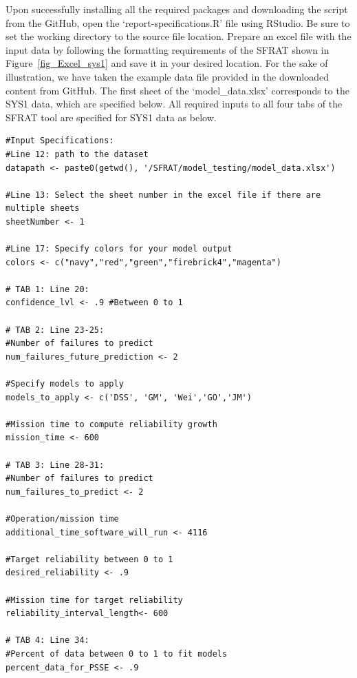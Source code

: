 \documentclass[conference]{IEEEtran}
\begin{document}
Upon successfully installing all the required packages and downloading the script from the GitHub, open the `report-specifications.R' file using RStudio. Be sure to set the working directory to the source file location. Prepare an excel file with the input data by following the formatting requirements of the SFRAT shown in Figure~\ref{fig_Excel_sys1} and save it in your desired location. For the sake of illustration, we have taken the example data file provided in the downloaded content from GitHub. The first sheet of the `model\_data.xlsx' corresponds to the SYS1 data, which are specified below. All required inputs to all four tabs of the SFRAT tool are specified for SYS1 data as below.
\begin{lstlisting}
#Input Specifications:
#Line 12: path to the dataset
datapath <- paste0(getwd(), '/SFRAT/model_testing/model_data.xlsx')   

#Line 13: Select the sheet number in the excel file if there are multiple sheets
sheetNumber <- 1  
       
#Line 17: Specify colors for your model output
colors <- c("navy","red","green","firebrick4","magenta") 

# TAB 1: Line 20: 
confidence_lvl <- .9 #Between 0 to 1

# TAB 2: Line 23-25:
#Number of failures to predict
num_failures_future_prediction <- 2 

#Specify models to apply
models_to_apply <- c('DSS', 'GM', 'Wei','GO','JM') 

#Mission time to compute reliability growth
mission_time <- 600

# TAB 3: Line 28-31:
#Number of failures to predict
num_failures_to_predict <- 2 

#Operation/mission time
additional_time_software_will_run <- 4116 

#Target reliability between 0 to 1
desired_reliability <- .9  

#Mission time for target reliability
reliability_interval_length<- 600 

# TAB 4: Line 34: 
#Percent of data between 0 to 1 to fit models
percent_data_for_PSSE <- .9 
\end{lstlisting}

\end{document}

